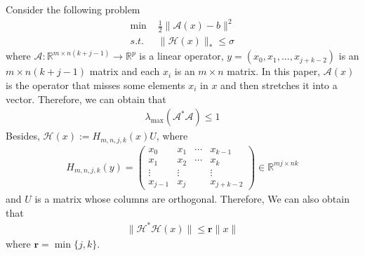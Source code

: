 \documentclass{article}
\numberwithin{equation}{section}
\begin{document}
Consider the following problem
\begin{align} \label{Hankel Matrix}
    \min\limits \hspace{4pt}&\frac{1}{2}\|\mathcal{A}(x)-b\rVert^2 \nonumber\\
    s.t. \hspace{4pt} &\| \mathcal{H}(x) \rVert_* \leq \sigma   
\end{align}
where $\mathcal{A}: \mathbb{R}^{m\times n(k+j-1)} \rightarrow \mathbb{R}^p$ is a linear operator,   
$y =\left(x_0, x_1,...,x_{j+k-2}\right)$ is an $m \times n(k+j-1)$ matrix and each
$x_i$ is an $m\times n$ matrix. In this paper, $\mathcal{A}(x)$ is the operator that misses some elements
$x_i$ in $x$ and then stretches it into a vector.  Therefore, we can obtain that
\begin{align}
    \lambda_{\max}(\mathcal{A}^*\mathcal{A}) \leq 1 \nonumber
\end{align}
Besides, $\mathcal{H}(x) := H_{m, n, j, k}(x)U$, where
\begin{align}
    H_{m,n,j,k}(y) = \left(
        \begin{array}{cccc}
            x_0 & x_1 & \cdots &x_{k-1} \\
            x_1 & x_2 & \cdots &x_{k} \\
            \vdots & \vdots &  &\vdots \\
            x_{j-1} &x_{j}  &  &x_{j+k-2} 
        \end{array} \nonumber
    \right) \in \mathbb{R}^{mj\times nk}
\end{align}
and
$U$ is a matrix whose columns are orthogonal. Therefore, We can also obtain that 
\begin{align}
    \| \mathcal{H}^*\mathcal{H}(x) \rVert \leq \mathbf{r}\| x\rVert \nonumber
\end{align}
where $\mathbf{r} = \min\{ j,k\}$.
\end{document}
